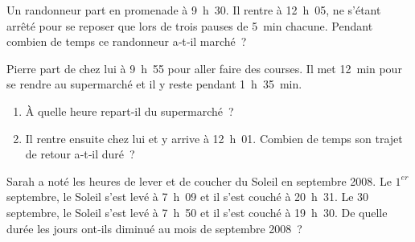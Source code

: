 \begin{exercice}
Un randonneur part en promenade à 9 h 30. Il rentre à 12 h 05, ne s'étant arrêté pour se reposer que lors de trois pauses de 5 min chacune. Pendant combien de temps ce randonneur a‑t‑il marché ?
\end{exercice}


\begin{exercice}
Pierre part de chez lui à 9 h 55 pour aller faire des courses. Il met 12 min pour se rendre au supermarché et il y reste pendant 1 h 35 min.
\begin{enumerate} 
 \item À quelle heure repart‑il du supermarché ?
 \item Il rentre ensuite chez lui et y arrive à 12 h 01. Combien de temps son trajet de retour a‑t‑il duré ?
 \end{enumerate}
\end{exercice}


\begin{exercice}
Sarah a noté les heures de lever et de coucher du Soleil en septembre 2008. Le $1^{er}$ septembre, le Soleil s'est levé à 7 h 09 et il s'est couché à 20 h 31. Le 30 septembre, le Soleil s'est levé à 7 h 50 et il s'est couché à 19 h 30. De quelle durée les jours ont‑ils diminué au mois de septembre 2008 ?
\end{exercice}
 